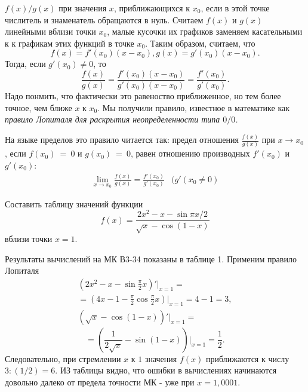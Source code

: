 \begin{multicols}{2}
\linespread{0.65}\selectfont
\noindent $f(x)/g(x)$ при значения $x$, приближающихся к $x_0$, если в этой точке числитель и знаменатель обращаются в нуль. Считаем $f(x)$ и $g(x)$ линейными вблизи точки $x_0$, малые кусочки их графиков заменяем касательными к к графикам этих функций в точке $x_0$. Таким образом, считаем, что\[f(x) = f'(x_0)(x-x_0), g(x)=g'(x_0)(x-x_0).\] Тогда, если $g'(x_0)\neq0$, то\[\frac{f(x)}{g(x)}=\frac{f'(x_0)(x-x_0)}{g'(x_0)(x-x_0)}=\frac{f'(x_0)}{g'(x_0)}.\] Надо понмить, что фактически это равеноство приближенное, но тем более точное, чем ближе $x$ к $x_0$. Мы получили правило, известное в математике как \itshape правило Лопиталя для раскрытия неопределенности типа $0/0$\upshape.

\linespread{0.65}\selectfont
{\footnotesize На языке пределов это правило читается так: предел отношения $\frac{f(x)}{g(x)}$ при $x\rightarrow x_0$, если $f(x_0)~=~0$ и $g(x_0)~=~0$, равен отношению производных $f'(x_0)$ и $g'(x_0)$:
{\setlength{\belowdisplayskip}{1dd} \setlength{\belowdisplayshortskip}{1dd}
\setlength{\abovedisplayskip}{1dd} \setlength{\abovedisplayshortskip}{1dd}
\[\begin{array}{cr}
\lim\limits_{x \to x_0} \frac{f(x)}{g(x)}=
\frac{f'(x_0)}{g'(x_0)}&(g'(x_0\neq 0)
\end{array}\]}}
\begin{exmp}
Составить таблицу значений функции \[f(x) = \frac{2x^2-x-
\sin\pi x/2}{\sqrt{x}-\cos(1-x)}\]вблизи точки $x=1$.
\end{exmp}
\begin{sol}
Результаты вычислений на МК В3-34 показаны в таблице 1. Применим правило Лопиталя
\begin{multline*}
(2x^2-x-\sin\frac{\pi}{2}x)'\vert_{x=1}=\\
= (4x-1-\frac{\pi}{2}\cos\frac{\pi}{2}x)\vert_{x=1} = 4 -1 =3,\\
(\sqrt{x}-\cos(1-x))'\vert_{x=1}=
\end{multline*}
\[=(\frac{1}{2\sqrt{x}}-\sin(1-x))\vert_{x=1}=\frac{1}{2}.\]
Следовательно, при стремлении $x$ к $1$ значения $f(x)$ приближаются к числу $3:(1/2)=6$. ИЗ таблицы видно, что ошибки в вычислениях начинаются довольно далеко от предела точности МК - уже при $x=1,0001$.
\end{sol}

\end{multicols}
